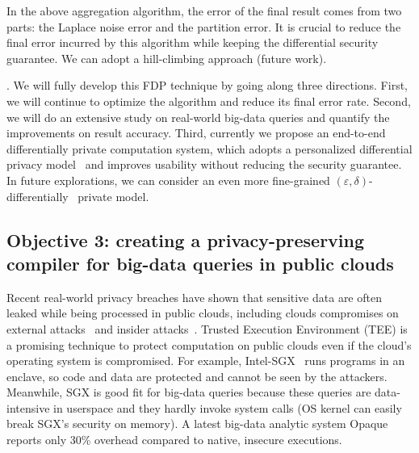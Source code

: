 In the above aggregation algorithm, the error of the final result comes from 
two parts: the Laplace noise error and the partition error. It is crucial to 
reduce the final error incurred by this algorithm while keeping the 
differential security guarantee. We can adopt a hill-climbing approach (future 
work).

. We will fully develop this FDP technique by going 
along three directions. First, we will continue to optimize the algorithm and 
reduce its final error rate. Second, we will do an extensive study on 
real-world big-data queries and quantify the improvements on result accuracy. 
Third, currently we propose an end-to-end differentially private computation
system, which adopts a personalized differential privacy 
model~\cite{pdp:icde15} and improves usability without reducing the security 
guarantee. In future explorations, we can consider an even more fine-grained 
$(\varepsilon, \delta)$-differentially~\cite{differntialprivacy:tcc06}
private model.


\vspace{-.15in}\subsection{Objective 3: creating a privacy-preserving compiler 
for big-data queries in public clouds}\label{sec:obj3}\vspace{-.075in}


Recent real-world privacy breaches have shown that sensitive data are often 
leaked while being processed in public clouds, including clouds 
compromises on external attacks~\cite{icloud-breach} and 
insider attacks~\cite{top-threats}. Trusted Execution Environment 
(TEE) is a promising technique to protect computation on public clouds even if 
the cloud's operating system is compromised. For example, 
Intel-SGX~\cite{intel-sgx} runs programs in an enclave, so code and data are 
protected and cannot be seen by the attackers. Meanwhile, SGX is good fit for 
big-data queries because these queries are data-intensive in userspace and they 
hardly invoke system calls (OS kernel can easily break SGX's security on 
memory). A latest big-data analytic system Opaque~\cite{opaque:nsdi17} reports 
only 30\% overhead compared to native, insecure executions.

